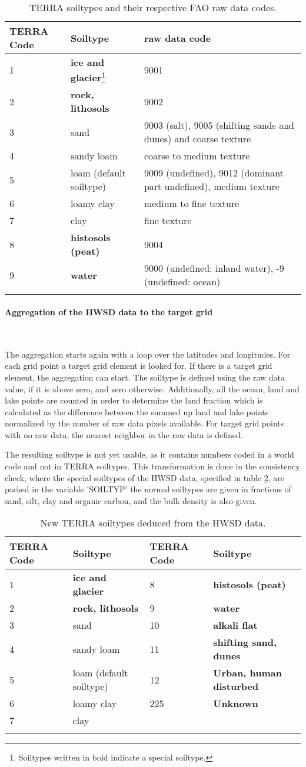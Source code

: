 \documentclass[a4paper,10pt,DIV14,BCOR1cm,titlepage,twoside]{scrartcl}
\providecommand{\tabularnewline}{\\}
\begin{document}
\begin{longtable}{p{2.5cm}p{3.5cm}p{8cm}}
\textbf{TERRA Code} & \textbf{Soiltype} & \textbf{raw data code} \tabularnewline
\hline
\endhead
\hline
1 & \textbf{ice and glacier}\footnote{Soiltypes written in bold indicate a special soiltype.} & 9001  \tabularnewline
2 & \textbf{rock, lithosols} & 9002 \tabularnewline
3 & sand & 9003 (salt), 9005 (shifting sands and dunes) and coarse texture\tabularnewline 
4 & sandy loam & coarse to medium texture \tabularnewline
5 & loam (default soiltype) & 9009 (undefined), 9012 (dominant part undefined), medium texture \tabularnewline
6 & loamy clay & medium to fine texture \tabularnewline
7 & clay & fine texture\tabularnewline
8 &  \textbf{histosols (peat)} & 9004 \tabularnewline
9 &  \textbf{water} & 9000 (undefined: inland water), -9 (undefined: ocean) \tabularnewline
\bottomrule
\caption{TERRA soiltypes and their respective FAO raw data codes.}
\label{tab:soil_types_FAO}
\end{longtable}
\paragraph{Aggregation of the HWSD data to the target grid}\ \par\medskip\noindent
The aggregation starts again with a loop over the latitudes and longitudes. For each grid point a target grid element is looked for. If there is a target grid element, the aggregation can start. The soiltype is defined using the raw data value, if it is above zero, and zero otherwise. Additionally, all the ocean, land and lake points are counted in order to determine the land fraction which is calculated as the difference between the summed up land and lake points normalized by the number of raw data pixels available. For target grid points with no raw data, the nearest neighbor in the raw data is defined. \par\medskip\noindent
The resulting soiltype is not yet usable, as it contains numbers coded in a world code and not in TERRA soiltypes. This transformation is done in the consistency check, where the special soiltypes of the HWSD data, specified in table \ref{tab:soil_types_HWSD}, are packed in the variable 'SOILTYP' the normal soiltypes are given in fractions of sand, silt, clay and organic carbon, and the bulk density is also given. \par\medskip\noindent
\begin{longtable}{p{2.5cm}p{4.75cm}|p{2.5cm}p{4.75cm}}
\textbf{TERRA Code} & \textbf{Soiltype} & \textbf{TERRA Code} & \textbf{Soiltype} \tabularnewline
\hline
\endhead
\hline
1 & \textbf{ice and glacier} & 8 &  \textbf{histosols (peat)}  \tabularnewline
2 & \textbf{rock, lithosols} & 9 &  \textbf{water}  \tabularnewline
3 & sand & 10 &  \textbf{alkali flat} \tabularnewline
4 & sandy loam & 11 &  \textbf{shifting sand, dunes}  \tabularnewline
5 & loam (default soiltype) & 12 &  \textbf{Urban, human disturbed} \tabularnewline
6 & loamy clay & 225 &  \textbf{Unknown} \tabularnewline
7 & clay & & \tabularnewline
\bottomrule
\caption{New TERRA soiltypes deduced from the HWSD data.}
\label{tab:soil_types_HWSD}
\end{longtable}
\end{document}
